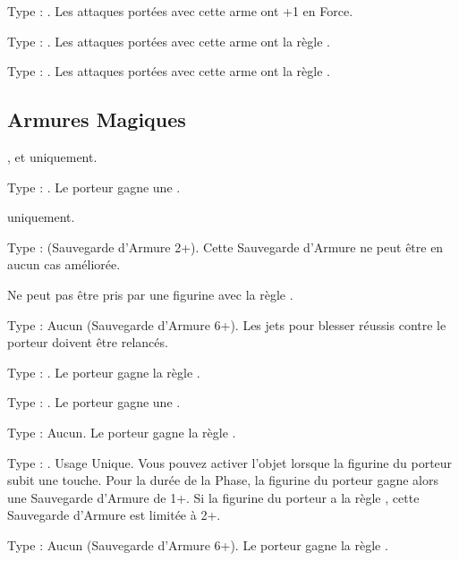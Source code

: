 Type : \hw{}. Les attaques portées avec cette arme ont +1 en Force.

Type : \lance{}. Les attaques portées avec cette arme ont la règle \flamingattacks{}.

Type : \hw{}. Les attaques portées avec cette arme ont la règle .

\endpricelist

\newpage
\hypertarget{magicalarmour}{\subsection{Armures Magiques}}
\label{magical_armour}

\startpricelist

\infantry{}, \warbeasts{} et \cavalry{} uniquement.

Type : \ha{}. Le porteur gagne une .

\infantry{} uniquement.

Type : \ha{} (Sauvegarde d'Armure 2+). Cette Sauvegarde d'Armure ne peut être en aucun cas améliorée.

Ne peut pas être pris par une figurine avec la règle \toweringpresence{}.

Type : Aucun (Sauvegarde d'Armure 6+). Les jets pour blesser réussis contre le porteur doivent être relancés.

Type : \ha{}. Le porteur gagne la règle \distracting{}.

Type : \ha{}. Le porteur gagne une .

Type : Aucun. Le porteur gagne la règle .

\columnbreak

Type : \ha{}. Usage Unique. Vous pouvez activer l'objet lorsque la figurine du porteur subit une touche. Pour la durée de la Phase, la figurine du porteur gagne alors une Sauvegarde d'Armure de 1+. Si la figurine du porteur a la règle \toweringpresence{}, cette Sauvegarde d'Armure est limitée à 2+.

Type : Aucun (Sauvegarde d'Armure 6+). Le porteur gagne la règle \fireborn{}.

